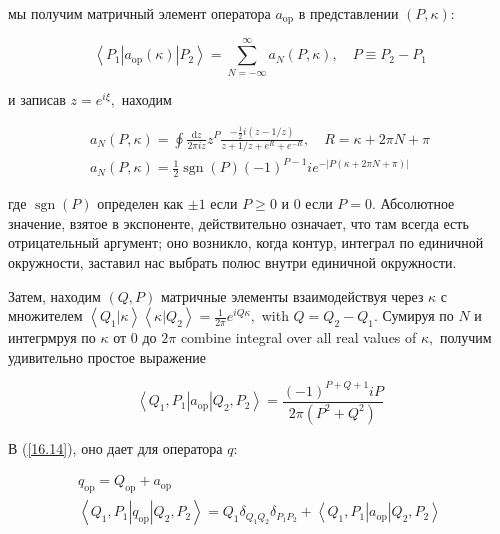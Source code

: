 \documentclass[main.tex]{subfiles}
\begin{document}
мы получим матричный элемент оператора $a_{\mathrm{op}}$ в представлении $(P, \kappa)$:

\begin{equation}\label{16.35} 
\left\langle P_{1}\left|a_{\mathrm{op}}(\kappa)\right| P_{2}\right\rangle=\sum_{N=-\infty}^{\infty} a_{N}(P, \kappa), \quad P \equiv P_{2}-P_{1}
\end{equation}

и записав $z=e^{i \xi},$ находим

\begin{equation}\label{16.36}
\begin{array}{l}
a_{N}(P, \kappa)=\oint \frac{\mathrm{d} z}{2 \pi i z} z^{P} \frac{-\frac{1}{2} i(z-1 / z)}{z+1 / z+e^{R}+e^{-R}}, \quad R=\kappa+2 \pi N+\pi \\
a_{N}(P, \kappa)=\frac{1}{2} \operatorname{sgn}(P)(-1)^{P-1} i e^{-|P(\kappa+2 \pi N+\pi)|}
\end{array}
\end{equation}

где $\operatorname{sgn}(P)$ определен как $\pm 1$ если $P \geq 0$ и 0 если $P=0 .$ Абсолютное значение, взятое в экспоненте, действительно означает, что там всегда есть отрицательный аргумент; оно возникло, когда контур, интеграл по единичной окружности, заставил нас выбрать полюс внутри единичной окружности.

Затем, находим $(Q, P)$ матричные элементы взаимодействуя через $\kappa$ с множителем $\left\langle Q_{1} | \kappa\right\rangle\left\langle\kappa | Q_{2}\right\rangle=\frac{1}{2 \pi} e^{i Q \kappa},$ with $Q=Q_{2}-Q_{1} .$ Сумируя по $N$ и интегрмруя по $\kappa$ от 0 до $2 \pi$ combine integral over all real values of $\kappa,$ получим удивительно простое выражение

\begin{equation}\label{16.37} 
\left\langle Q_{1}, P_{1}\left|a_{\mathrm{op}}\right| Q_{2}, P_{2}\right\rangle=\frac{(-1)^{P+Q+1} i P}{2 \pi\left(P^{2}+Q^{2}\right)}
\end{equation}

В (\ref{16.14}), оно дает для оператора $q$:

\begin{equation}\label{16.38}
	\begin{array}{c}
{q_{\mathrm{op}}=Q_{\mathrm{op}}+a_{\mathrm{op}}} \\
{\left\langle Q_{1}, P_{1}\left|q_{\mathrm{op}}\right| Q_{2}, P_{2}\right\rangle= Q_{1} \delta_{Q_{1} Q_{2}} \delta_{P_{1} P_{2}}+\left\langle Q_{1}, P_{1}\left|a_{\mathrm{op}}\right| Q_{2}, P_{2}\right\rangle}
\end{array}
\end{equation}
\end{document}
